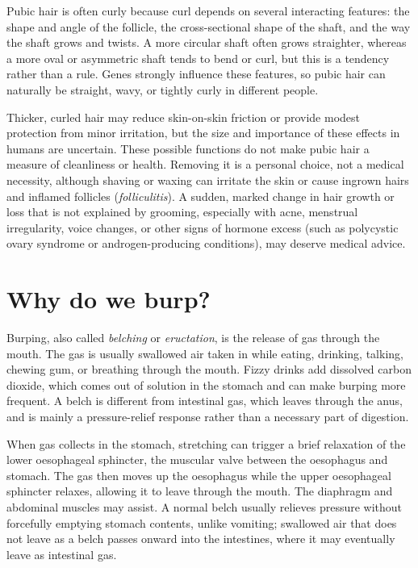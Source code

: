 \documentclass[11pt,oneside]{report}
\begin{document}
Pubic hair is often curly because curl depends on several interacting features:
the shape and angle of the follicle, the cross-sectional shape of the shaft, and
the way the shaft grows and twists. A more circular shaft often grows straighter,
whereas a more oval or asymmetric shaft tends to bend or curl, but this is a
tendency rather than a rule. Genes strongly influence these features, so pubic
hair can naturally be straight, wavy, or tightly curly in different people.

Thicker, curled hair may reduce skin-on-skin friction or provide modest
protection from minor irritation, but the size and importance of these effects
in humans are uncertain. These possible functions do not make pubic hair a
measure of cleanliness or health. Removing it is a personal choice, not a
medical necessity, although shaving or waxing can irritate the skin or cause
ingrown hairs and inflamed follicles (\emph{folliculitis}). A sudden, marked
change in hair growth or loss that is not explained by grooming, especially with
acne, menstrual irregularity, voice changes, or other signs of hormone excess
(such as polycystic ovary syndrome or androgen-producing conditions), may
deserve medical advice.

\section{Why do we burp?}

Burping, also called \emph{belching} or \emph{eructation}, is the release of
gas through the mouth. The gas is usually swallowed air taken in while eating,
drinking, talking, chewing gum, or breathing through the mouth. Fizzy drinks
add dissolved carbon dioxide, which comes out of solution in the stomach and can
make burping more frequent. A belch is different from intestinal gas, which
leaves through the anus, and is mainly a pressure-relief response rather than a
necessary part of digestion.

When gas collects in the stomach, stretching can trigger a brief relaxation of
the lower oesophageal sphincter, the muscular valve between the oesophagus and
stomach. The gas then moves up the oesophagus while the upper oesophageal
sphincter relaxes, allowing it to leave through the mouth. The diaphragm and
abdominal muscles may assist. A normal belch usually relieves pressure without
forcefully emptying stomach contents, unlike vomiting; swallowed air that does
not leave as a belch passes onward into the intestines, where it may eventually
leave as intestinal gas.
\end{document}
